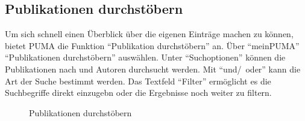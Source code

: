 \subsection{Publikationen durchstöbern}
Um sich schnell einen Überblick über die eigenen Einträge machen zu können, bietet PUMA die Funktion \enquote{Publikation durchstöbern} an. Über \enquote{meinPUMA} \enquote{Publikationen durchstöbern} auswählen. Unter \enquote{Suchoptionen} können die Publikationen nach \tags und Autoren durchsucht werden. Mit \enquote{und/~oder} kann die Art der Suche bestimmt werden. Das Textfeld \enquote{Filter} ermöglicht es die Suchbegriffe direkt einzugebn oder die Ergebnisse noch weiter zu filtern.
\begin{figure}[h!] 
\centering
 \caption{Publikationen durchstöbern}
 \label{figure029}
\end{figure}

